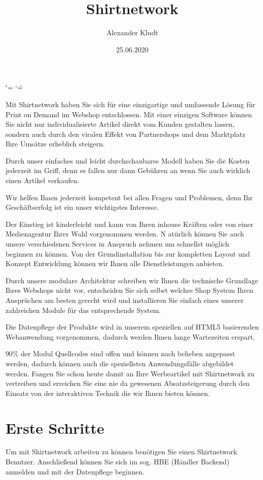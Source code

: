 \documentclass[letterpaper,10pt,ngerman]{sphinxmanual}
\title{Shirtnetwork}
\date{25.06.2020}
\author{Alexander Kludt}
\begin{document}
\ifdefined\shorthandoff
  \ifnum\catcode`\=\string=\active\shorthandoff{=}\fi
  \ifnum\catcode`\"=\active{}\fi
\fi

\pagestyle{empty}
\sphinxmaketitle
\pagestyle{plain}
\sphinxtableofcontents
\pagestyle{normal}
\label{\detokenize{index::doc}}


Mit Shirtnetwork haben Sie sich für eine einzigartige und umfassende Lösung für Print on Demand im Webshop entschlossen.
Mit einer einzigen Software können Sie nicht nur individualisierte Artikel direkt vom Kunden gestalten lassen,
sondern auch durch den viralen Effekt von Partnershops und dem Marktplatz Ihre Umsätze erheblich steigern.

Durch unser einfaches und leicht durchschaubares Modell haben Sie die Kosten jederzeit im Griff,
denn es fallen nur dann Gebühren an wenn Sie auch wirklich einen Artikel verkaufen.

Wir helfen Ihnen jederzeit kompetent bei allen Fragen und Problemen, denn Ihr Geschäftserfolg ist ein unser wichtigstes Interesse.

Der Einstieg ist kinderleicht und kann von Ihren in\sphinxhyphen{}house Kräften oder von einer Medienagentur Ihrer Wahl vor\sphinxhyphen{}genommen werden. N
atürlich können Sie auch unsere verschiedenen Services in Anspruch nehmen um schnellst möglich beginnen zu können.
Von der Grundinstallation bis zur kompletten Layout und Konzept Entwicklung können wir Ihnen alle Dienstleistungen anbieten.

Durch unsere modulare Architektur schreiben wir Ihnen die technische Grundlage Ihres Webshops nicht vor,
entscheiden Sie sich selbst welches Shop System Ihren Ansprüchen am besten gerecht wird und installieren Sie einfach eines unserer zahlreichen Module für das entsprechende System.

Die Datenpflege der Produkte wird in unserem speziellen auf HTML5 basierenden Webanwendung vorgenommen, dadurch werden Ihnen lange Wartezeiten erspart.

90\% der Modul Quellcodes sind offen und können nach belieben angepasst werden, dadurch können auch die speziellsten Anwendungsfälle abgebildet werden.
Fangen Sie schon heute damit an Ihre Werbeartikel mit Shirtnetwork zu vertreiben und erreichen Sie eine nie da gewesenen Absatzsteigerung durch den Einsatz von der interaktiven Technik die wir Ihnen bieten können.


\chapter{Erste Schritte}
\label{\detokenize{intro/index:erste-schritte}}\label{\detokenize{intro/index::doc}}
Um mit Shirtnetwork arbeiten zu können benötigen Sie einen Shirtnetwork Benutzer.
Anschließend können Sie sich im sog. HBE (Händler Backend) anmelden und mit der Datenpflege beginnen.
\end{document}
